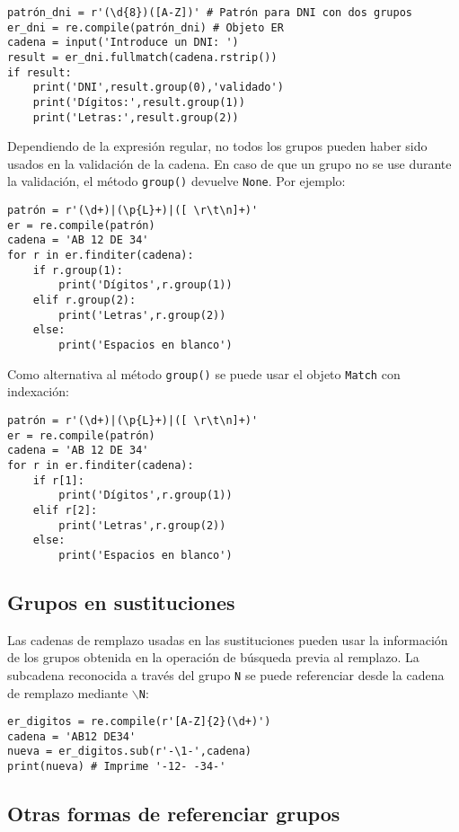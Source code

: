 \begin{lstlisting}
patrón_dni = r'(\d{8})([A-Z])' # Patrón para DNI con dos grupos
er_dni = re.compile(patrón_dni) # Objeto ER
cadena = input('Introduce un DNI: ')
result = er_dni.fullmatch(cadena.rstrip())
if result:
    print('DNI',result.group(0),'validado')
    print('Dígitos:',result.group(1))
    print('Letras:',result.group(2))
\end{lstlisting}

Dependiendo de la expresión regular, no todos los grupos pueden haber sido usados en la validación de la cadena. En caso de que un grupo no se use durante la validación, el método \texttt{group()} devuelve \texttt{None}. Por ejemplo:

\begin{lstlisting}
patrón = r'(\d+)|(\p{L}+)|([ \r\t\n]+)'
er = re.compile(patrón)
cadena = 'AB 12 DE 34'
for r in er.finditer(cadena):
    if r.group(1):
        print('Dígitos',r.group(1))
    elif r.group(2):
        print('Letras',r.group(2))
    else:
        print('Espacios en blanco')
\end{lstlisting}

Como alternativa al método \texttt{group()} se puede usar el objeto \texttt{Match} con indexación:

\begin{lstlisting}
patrón = r'(\d+)|(\p{L}+)|([ \r\t\n]+)'
er = re.compile(patrón)
cadena = 'AB 12 DE 34'
for r in er.finditer(cadena):
    if r[1]:
        print('Dígitos',r.group(1))
    elif r[2]:
        print('Letras',r.group(2))
    else:
        print('Espacios en blanco')
\end{lstlisting}

\subsection{Grupos en sustituciones}

Las cadenas de remplazo usadas en las sustituciones pueden usar la información de los grupos obtenida en la operación de búsqueda previa al remplazo. La subcadena reconocida a través del grupo \texttt{N} se puede referenciar desde la cadena de remplazo mediante \texttt{$\backslash$N}:

\begin{lstlisting}
er_digitos = re.compile(r'[A-Z]{2}(\d+)')
cadena = 'AB12 DE34'
nueva = er_digitos.sub(r'-\1-',cadena)
print(nueva) # Imprime '-12- -34-'
\end{lstlisting}

\subsection{Otras formas de referenciar grupos}

